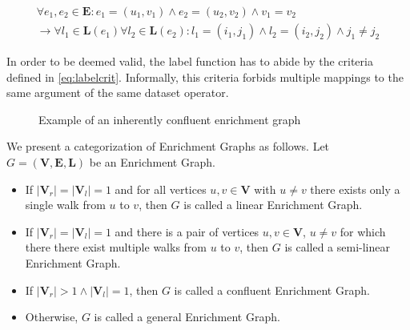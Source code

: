 \begin{equation}
  \begin{aligned}
    \forall e_1, e_2 \in \mathbf{E} \colon e_1=(u_1,v_1) \land e_2=(u_2,v_2) \land v_1 = v_2\\ \to
    \forall l_1 \in \mathbf{L}(e_1) \forall l_2 \in \mathbf{L}(e_2) \colon l_1 = (i_1, j_1) \land l_2 = (i_2, j_2) \land j_1\neq j_2
  \end{aligned}
  \label{eq:labelcrit}
\end{equation}

In order to be deemed valid, the label function has to abide by the criteria defined in \autoref{eq:labelcrit}.
Informally, this criteria forbids multiple mappings to the same argument of the same dataset operator.

\begin{figure}[tb]
\centering
\caption{Example of an inherently confluent enrichment graph}
\label{fig:exampleenrichmentgraph}
\end{figure}

We present a categorization of Enrichment Graphs as follows. Let $G=(\mathbf{V},\mathbf{E},\mathbf{L})$ be an Enrichment Graph.

\begin{itemize}
  \item If $|\mathbf{V}_r|=|\mathbf{V}_l|=1$ and for all vertices $u,v\in\mathbf{V}$ with $u\neq v$ there exists only a single walk from $u$ to $v$, then $G$ is called a linear Enrichment Graph.
  \item If $|\mathbf{V}_r|=|\mathbf{V}_l|=1$ and there is a pair of vertices $u,v\in\mathbf{V}$,  $u\neq v$ for which there there exist multiple walks from $u$ to $v$, then $G$ is called a semi-linear Enrichment Graph.
  \item If $|\mathbf{V}_r|>1 \land |\mathbf{V}_l|=1$, then $G$ is called a confluent Enrichment Graph.
  \item Otherwise, $G$ is called a general Enrichment Graph.
\end{itemize}


